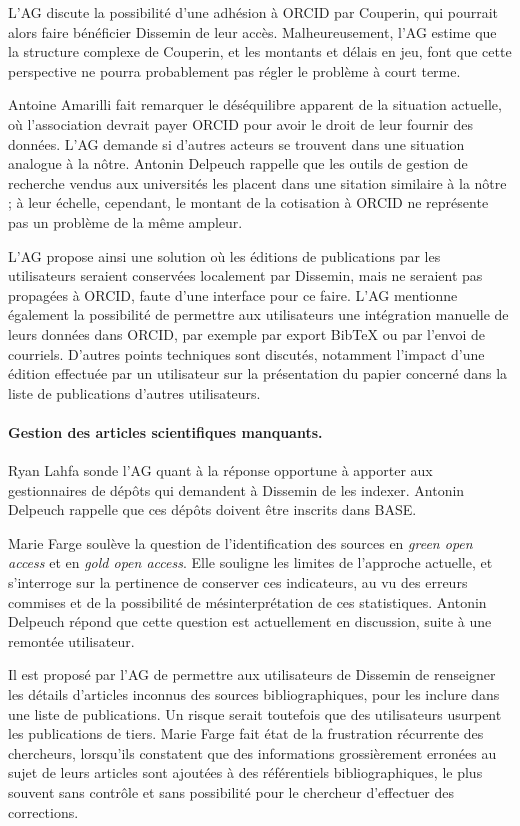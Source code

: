 \documentclass{scrartcl}
\begin{document}
L'AG discute la possibilité d'une adhésion à ORCID par Couperin, qui pourrait
alors faire bénéficier Dissemin de leur accès. Malheureusement, l'AG estime que
la structure complexe de Couperin, et les montants et délais en jeu, font que
cette perspective ne pourra probablement pas régler le problème à court terme.

Antoine Amarilli fait remarquer le déséquilibre apparent de la situation
actuelle, où l'association devrait payer ORCID pour avoir le droit de leur
fournir des données. L'AG demande si d'autres acteurs se trouvent dans une
situation analogue à la nôtre. Antonin Delpeuch rappelle que les outils de
gestion de recherche vendus aux universités les placent dans une sitation
similaire à la nôtre ; à leur échelle, cependant, le montant de la cotisation à
ORCID ne représente pas un problème de la même ampleur.

L'AG propose ainsi une solution où les éditions de publications par les
utilisateurs seraient conservées localement par Dissemin, mais ne seraient pas
propagées à ORCID, faute d'une interface pour ce faire. L'AG mentionne également
la possibilité de permettre aux utilisateurs une intégration manuelle de leurs
données dans ORCID, par exemple par export BibTeX ou par l'envoi de courriels.
D'autres points techniques sont discutés, notamment l'impact d'une édition
effectuée par un utilisateur sur la présentation du papier concerné dans la
liste de publications d'autres utilisateurs.

\paragraph{Gestion des articles scientifiques manquants.} Ryan Lahfa sonde
l'AG quant à la réponse opportune à apporter aux gestionnaires de dépôts qui
demandent à Dissemin de les indexer. Antonin Delpeuch rappelle que ces dépôts
doivent être inscrits dans BASE.

Marie Farge soulève la question de l'identification des sources en \emph{green
open access} et en \emph{gold open access}. Elle souligne les limites de
l'approche actuelle, et s'interroge sur la pertinence de conserver ces
indicateurs, au vu des erreurs commises et de la possibilité de
mésinterprétation de ces statistiques. Antonin Delpeuch répond que cette
question est actuellement en discussion, suite à une remontée utilisateur.

Il est proposé par l'AG de permettre aux utilisateurs de Dissemin de renseigner
les détails d'articles inconnus des sources bibliographiques, pour les inclure
dans une liste de publications. Un risque serait toutefois que des utilisateurs
usurpent les publications de tiers. Marie Farge fait état de la frustration
récurrente des chercheurs, lorsqu'ils constatent que des informations
grossièrement erronées au sujet de leurs articles sont ajoutées à des
référentiels bibliographiques, le plus souvent sans contrôle et sans possibilité
pour le chercheur d'effectuer des corrections.
\end{document}
